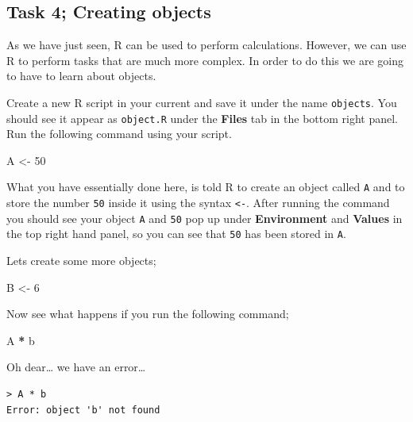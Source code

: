 \documentclass[
]{book}
\newenvironment{Shaded}{\begin{snugshade}}{\end{snugshade}}
\newcommand{\DecValTok}[1]{\textcolor[rgb]{0.00,0.00,0.81}{#1}}
\newcommand{\NormalTok}[1]{#1}
\newcommand{\OtherTok}[1]{\textcolor[rgb]{0.56,0.35,0.01}{#1}}
\newcommand{\SpecialCharTok}[1]{\textcolor[rgb]{0.81,0.36,0.00}{\textbf{#1}}}
\begin{document}
\subsection{Task 4; Creating objects}\label{task-4-creating-objects}

As we have just seen, R can be used to perform calculations. However, we can use R to perform tasks that are much more complex. In order to do this we are going to have to learn about objects.

Create a new R script in your current and save it under the name \texttt{objects}. You should see it appear as \texttt{object.R} under the \textbf{Files} tab in the bottom right panel. Run the following command using your script.

\begin{Shaded}
\begin{Highlighting}[]
\NormalTok{A }\OtherTok{\textless{}{-}} \DecValTok{50}
\end{Highlighting}
\end{Shaded}

What you have essentially done here, is told R to create an object called \texttt{A} and to store the number \texttt{50} inside it using the syntax \texttt{\textless{}-}. After running the command you should see your object \texttt{A} and \texttt{50} pop up under \textbf{Environment} and \textbf{Values} in the top right hand panel, so you can see that \texttt{50} has been stored in \texttt{A}.

Lets create some more objects;

\begin{Shaded}
\begin{Highlighting}[]
\NormalTok{B }\OtherTok{\textless{}{-}} \DecValTok{6}
\end{Highlighting}
\end{Shaded}

Now see what happens if you run the following command;

\begin{Shaded}
\begin{Highlighting}[]
\NormalTok{A }\SpecialCharTok{*}\NormalTok{ b}
\end{Highlighting}
\end{Shaded}

Oh dear\ldots{} we have an error\ldots{}

\begin{verbatim}
> A * b
Error: object 'b' not found
\end{verbatim}
\end{document}
